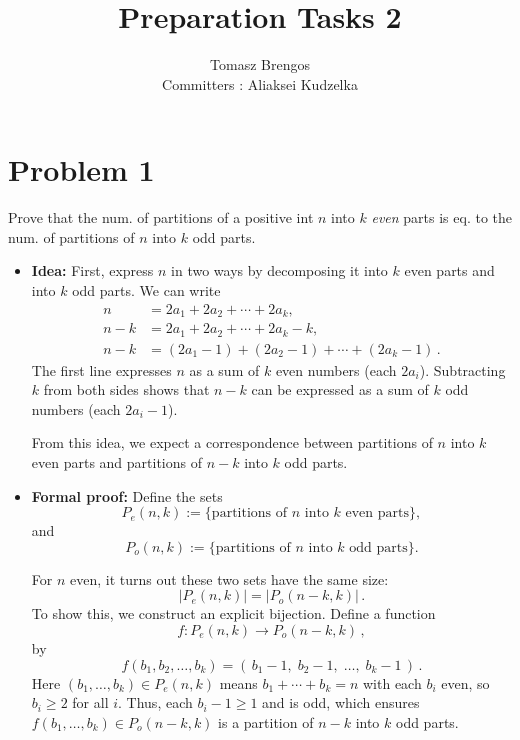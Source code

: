 \documentclass[docmute]{article}
\title{Preparation Tasks 2}
\author{Tomasz Brengos \\  
Committers : Aliaksei Kudzelka}
\date{}
\begin{document}
\maketitle

\section{Problem 1} Prove that the num. of partitions of a positive int $n$ into $k$ \textit{even} parts %
is eq. to the num. of partitions of $n$ into $k$ odd parts.

\begin{itemize}
  \item \textbf{Idea:} First, express $n$ in two ways by decomposing it into $k$ even parts and into $k$ odd parts. We can write 
  \begin{align*}
    n &= 2a_1 + 2a_2 + \cdots + 2a_k,\\
    n - k &= 2a_1 + 2a_2 + \cdots + 2a_k - k,\\
    n - k &= (2a_1 - 1) + (2a_2 - 1) + \cdots + (2a_k - 1)\,.
  \end{align*}
  The first line expresses $n$ as a sum of $k$ even numbers (each $2a_i$). Subtracting $k$ from both sides shows that $n-k$ can be expressed as a sum of $k$ odd numbers (each $2a_i - 1$). %
  
  From this idea, we expect a correspondence between partitions of $n$ into $k$ even parts and partitions of $n-k$ into $k$ odd parts.
  
  \item \textbf{Formal proof:} Define the sets 
  \[
    P_e(n,k) := \{\text{partitions of $n$ into $k$ even parts}\}, 
  \] 
  and 
  \[
    P_o(n,k) := \{\text{partitions of $n$ into $k$ odd parts}\}. 
  \] 
  
  For $n$ even, it turns out these two sets have the same size: 
  \[
    |P_e(n,k)| = |P_o(n-k,k)|\,.
  \] 
  To show this, we construct an explicit bijection. Define a function 
  \[
    f: P_e(n,k) \to P_o(n-k,k)\,,
  \] 
  by 
  \[
    f(b_1,b_2,\ldots,b_k) = (\,b_1 - 1,\; b_2 - 1,\; \ldots,\; b_k - 1\,)\,. 
  \] 
  Here $(b_1,\ldots,b_k) \in P_e(n,k)$ means $b_1 + \cdots + b_k = n$ with each $b_i$ even, so $b_i \ge 2$ for all $i$. Thus, each $b_i - 1 \ge 1$ and is odd, which ensures $f(b_1,\ldots,b_k) \in P_o(n-k,k)$ is a partition of $n-k$ into $k$ odd parts. %
  

\end{itemize}
\end{document}
